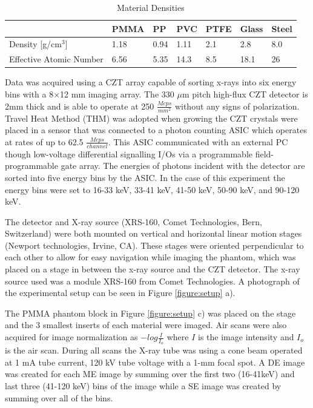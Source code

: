 \documentclass[a4paper,11pt]{article}
\begin{document}
\begin{table}[b]
\caption{Material Densities}
\begin{tabular}{lllllll}

                                                       & PMMA & PP    & PVC   & PTFE & Glass & Steel \\ \hline
Density {[}g/cm$^3${]}                  & 1.18 & 0.94  & 1.11  & 2.1  & 2.8   & 8.0   \\
Effective Atomic Number & 6.56    & 5.35 & 14.3 & 8.5 & 18.1 \cite{Sharma2012EffectiveGlasses}  & 26 
\end{tabular}
\label{table:densities}

\end{table}

Data was acquired using a CZT array capable of sorting x-rays into six energy bins with a 8$\times$12 mm imaging array. The 330 $\mu$m pitch high-flux CZT detector is 2mm thick and is able to operate at 250 $\frac{Mcps}{mm^2}$ without any signs of polarization. Travel Heat Method (THM) was adopted when growing the CZT crystals were placed in a sensor that was connected to a photon counting ASIC which operates at rates of up to 62.5 $\frac{Mcps}{channel}$. This ASIC communicated with an external PC though low-voltage differential signalling I/Os via a programmable field-programmable gate array. The energies of photons incident with the detector are sorted into five energy bins by the ASIC. In the case of this experiment the energy bins were set to 16-33 keV, 33-41 keV, 41-50 keV, 50-90 keV, and 90-120 keV.

The detector and X-ray source (XRS-160, Comet Technologies, Bern, Switzerland) were both mounted on vertical and horizontal linear motion stages (Newport technologies, Irvine, CA). These stages were oriented perpendicular to each other to allow for easy navigation while imaging the phantom, which was placed on a stage in between the x-ray source and the CZT detector. The x-ray source used was a module XRS-160 from Comet Technologies. A photograph of the experimental setup can be seen in Figure \ref{figure:setup} a). 

The PMMA phantom block in Figure \ref{figure:setup} c) was placed on the stage and the 3 smallest inserts of each material were imaged. Air scans were also acquired for image normalization as $-log\frac{I}{I_o}$ where $I$ is the image intensity and $I_o$ is the air scan. During all scans the X-ray tube was using a cone beam operated at 1 mA tube current, 120 kV tube voltage with a 1-mm focal spot. A DE image was created for each ME image by summing over the first two (16-41keV) and last three 
(41-120 keV) bins of the image while a SE image was created by summing over all of the bins.
\end{document}
